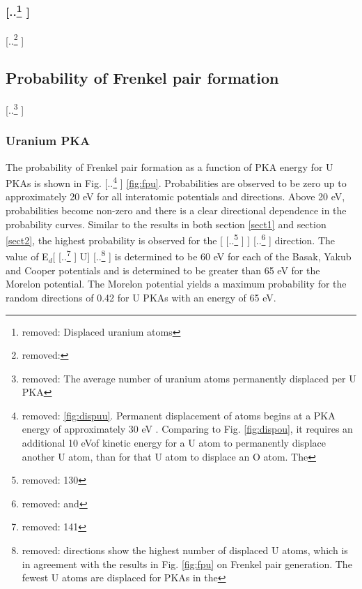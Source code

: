 \documentclass[review]{elsarticle} %
\providecommand{\DIFaddtex}[1]{{\protect\color{blue} \sf #1}} %
\providecommand{\DIFdeltex}[1]{{\protect\color{red} [..\footnote{removed: #1} ]}} %
\providecommand{\DIFaddbegin}{} %
\providecommand{\DIFaddend}{} %
\providecommand{\DIFdelbegin}{} %
\providecommand{\DIFdelend}{} %
\providecommand{\DIFadd}[1]{\texorpdfstring{\DIFaddtex{#1}}{#1}} %
\providecommand{\DIFdel}[1]{\texorpdfstring{\DIFdeltex{#1}}{}} %
\newcommand{\DIFscaledelfig}{0.5}
\newlength{\DIFdelgraphicswidth} %
\newlength{\DIFdelgraphicsheight} %
\newcommand{\DIFaddincludegraphics}[2][]{{\color{blue}\fbox{\DIFOincludegraphics[#1]{#2}}}} %
\newcommand{\DIFdelincludegraphics}[2][]{%
\sbox{\DIFdelgraphicsbox}{\DIFOincludegraphics[#1]{#2}}%
\settoboxwidth{\DIFdelgraphicswidth}{\DIFdelgraphicsbox} %
\settoboxtotalheight{\DIFdelgraphicsheight}{\DIFdelgraphicsbox} %
\scalebox{\DIFscaledelfig}{%
\parbox[b]{\DIFdelgraphicswidth}{\usebox{\DIFdelgraphicsbox}\\[-\baselineskip] \rule{\DIFdelgraphicswidth}{0em}}\llap{\resizebox{\DIFdelgraphicswidth}{\DIFdelgraphicsheight}{%
\setlength{\unitlength}{\DIFdelgraphicswidth}%
\begin{picture}(1,1)%
\thicklines\linethickness{2pt} %
{\color[rgb]{1,0,0}\put(0,0){\framebox(1,1){}}}%
{\color[rgb]{1,0,0}\put(0,0){\line( 1,1){1}}}%
{\color[rgb]{1,0,0}\put(0,1){\line(1,-1){1}}}%
\end{picture}%
}\hspace*{3pt}}} %
} %
\DeclareRobustCommand{\DIFaddbegin}{\DIFOaddbegin \let\includegraphics\DIFaddincludegraphics} %
\DeclareRobustCommand{\DIFaddend}{\DIFOaddend \let\includegraphics\DIFOincludegraphics} %
\DeclareRobustCommand{\DIFdelbegin}{\DIFOdelbegin \let\includegraphics\DIFdelincludegraphics} %
\DeclareRobustCommand{\DIFdelend}{\DIFOaddend \let\includegraphics\DIFOincludegraphics} %
\begin{document}
\FloatBarrier


\DIFdelbegin \subsubsection{\DIFdel{Displaced uranium atoms}}
\addtocounter{subsubsection}{-1}%
\DIFdel{\hspace{5mm}
}\DIFdelend \DIFaddbegin \subsection{\DIFadd{Probability of Frenkel pair formation}}
\DIFaddend 

\DIFdelbegin \DIFdel{The average number of uranium atoms permanently displaced per U PKA }\DIFdelend \DIFaddbegin \subsubsection{\DIFadd{Uranium PKA}}

\DIFadd{The probability of Frenkel pair formation }\DIFaddend as a function of PKA energy \DIFaddbegin \DIFadd{for U PKAs }\DIFaddend is shown in Fig. \DIFdelbegin \DIFdel{\ref{fig:dispuu}. Permanent displacement of atoms begins at a PKA energy of approximately 30 eV . Comparing to Fig. \ref{fig:dispou}, it requires an additional 10 eVof kinetic energy for a U atom to permanently displace another U atom, than for that U atom to displace an O atom. The }\DIFdelend \DIFaddbegin \DIFadd{\ref{fig:fpu}. Probabilities are observed to be zero up to approximately 20 eV for all interatomic potentials and directions. Above 20 eV, probabilities become non-zero and there is a clear directional dependence in the probability curves. Similar to the results in both section \ref{sect1} and section \ref{sect2}, the highest probability is observed for the }\DIFaddend [\DIFdelbegin \DIFdel{130}\DIFdelend \DIFaddbegin \DIFadd{100}\DIFaddend ] \DIFdelbegin \DIFdel{and }\DIFdelend \DIFaddbegin \DIFadd{direction. The value of E$_d$}\DIFaddend [\DIFdelbegin \DIFdel{141}\DIFdelend \DIFaddbegin \DIFadd{U}\DIFaddend ] \DIFdelbegin \DIFdel{directions show the highest number of displaced U atoms, which is in agreement with the results in Fig. \ref{fig:fpu} on Frenkel pair generation. The fewest U atoms are displaced for PKAs in the }\DIFdelend \DIFaddbegin \DIFadd{is determined to be 60 eV for each of the Basak, Yakub and Cooper potentials and is determined to be greater than 65 eV for the Morelon potential. The Morelon potential yields a maximum probability for the random directions of 0.42 for U PKAs with an energy of 65 eV.
}
\end{document}
